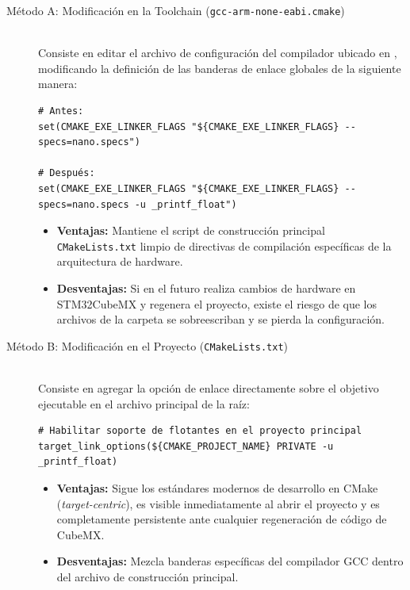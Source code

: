 \documentclass[
10pt, %
a4paper, %
oneside, %
headinclude,footinclude, %
BCOR5mm, %
]{scrartcl}
\begin{document}
\begin{description}
	\item[Método A: Modificación en la Toolchain (\texttt{gcc-arm-none-eabi.cmake})]~\\
	Consiste en editar el archivo de configuración del compilador ubicado en , modificando la definición de las banderas de enlace globales de la siguiente manera:
	
	\begin{lstlisting}[style=CMakeStyle]
# Antes:
set(CMAKE_EXE_LINKER_FLAGS "${CMAKE_EXE_LINKER_FLAGS} --specs=nano.specs")
		
# Después:
set(CMAKE_EXE_LINKER_FLAGS "${CMAKE_EXE_LINKER_FLAGS} --specs=nano.specs -u _printf_float")
	\end{lstlisting}
	
	\begin{itemize}
		\item \textbf{Ventajas:} Mantiene el script de construcción principal \texttt{CMakeLists.txt} limpio de directivas de compilación específicas de la arquitectura de hardware.
		\item \textbf{Desventajas:} Si en el futuro realiza cambios de hardware en STM32CubeMX y regenera el proyecto, existe el riesgo de que los archivos de la carpeta  se sobreescriban y se pierda la configuración.
	\end{itemize}
	
	\item[Método B: Modificación en el Proyecto (\texttt{CMakeLists.txt})]~\\
	Consiste en agregar la opción de enlace directamente sobre el objetivo ejecutable en el archivo principal de la raíz:
	
	\begin{lstlisting}[style=CMakeStyle]
# Habilitar soporte de flotantes en el proyecto principal
target_link_options(${CMAKE_PROJECT_NAME} PRIVATE -u _printf_float)
	\end{lstlisting}
	
	\begin{itemize}
		\item \textbf{Ventajas:} Sigue los estándares modernos de desarrollo en CMake (\textit{target-centric}), es visible inmediatamente al abrir el proyecto y es completamente persistente ante cualquier regeneración de código de CubeMX.
		\item \textbf{Desventajas:} Mezcla banderas específicas del compilador GCC dentro del archivo de construcción principal.
	\end{itemize}
\end{description}
\end{document}
